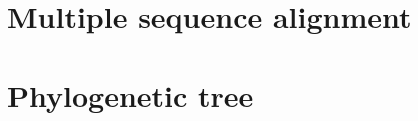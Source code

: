 \documentclass[12pt]{article}
\begin{document}
%
%
\setcounter{figure}{0}
\setcounter{table}{0}
\section{Multiple sequence alignment}



%
%
\setcounter{figure}{0}
\setcounter{table}{0}
\section{Phylogenetic tree}





\end{document}
